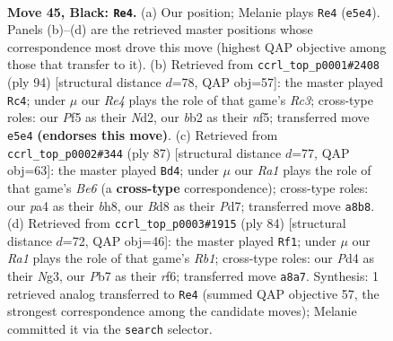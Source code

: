 \documentclass[11pt]{article}
\begin{document}
\clearpage

\begin{figure}[p]\centering
\begin{subfigure}{0.46\textwidth}\centering
\resizebox{\linewidth}{!}{%
\newchessgame
\chessboard[
  setfen={r2b4/1p5p/nk4pP/p3rp2/P2p1N2/3R2P1/1B6/R6K b - - 1 45},
  showmover=false,
  pgfstyle=straightmove, color=movearrow, markmove={e5-e4}
]}
\caption{}
\end{subfigure}\hfill
\begin{subfigure}{0.46\textwidth}\centering
\resizebox{\linewidth}{!}{%
\newchessgame
\chessboard[
  setfen={1r6/6pk/5p2/4pn1p/1r5P/1PR3P1/1R1N1PK1/8 w - - 37 48},
  showmover=false,
  pgfstyle=straightmove, color=movearrow, markmove={c3-c4}
]}
\caption{}
\end{subfigure}
\\[4pt]
\begin{subfigure}{0.46\textwidth}\centering
\resizebox{\linewidth}{!}{%
\newchessgame
\chessboard[
  setfen={7B/3p3p/2n1k1p1/8/pr2P3/Rp2b2P/1P4P1/R6K b - - 1 44},
  showmover=false,
  pgfstyle=straightmove, color=movearrow, markmove={e3-d4}
]}
\caption{}
\end{subfigure}\hfill
\begin{subfigure}{0.46\textwidth}\centering
\resizebox{\linewidth}{!}{%
\newchessgame
\chessboard[
  setfen={6k1/6r1/1p1p1r1p/p1n5/P1P5/1P2R1NP/6K1/1R6 w - - 2 43},
  showmover=false,
  pgfstyle=straightmove, color=movearrow, markmove={b1-f1}
]}
\caption{}
\end{subfigure}
\caption{\textbf{Move 45, Black: \texttt{Re4}.} (a) Our position; Melanie plays \texttt{Re4} (\texttt{e5e4}). Panels (b)--(d) are the retrieved master positions whose correspondence most drove this move (highest QAP objective among those that transfer to it). (b) Retrieved from \texttt{ccrl\_top\_p0001\#2408} (ply 94) [structural distance $d$=78, QAP obj=57]: the master played \texttt{Rc4}; under $\mu$ our \emph{Re4} plays the role of that game's \emph{Rc3}; cross-type roles: our \emph{P}f5 as their \emph{N}d2, our \emph{b}b2 as their \emph{n}f5; transferred move \texttt{e5e4} \textbf{(endorses this move)}. (c) Retrieved from \texttt{ccrl\_top\_p0002\#344} (ply 87) [structural distance $d$=77, QAP obj=63]: the master played \texttt{Bd4}; under $\mu$ our \emph{Ra1} plays the role of that game's \emph{Be6} (a \textbf{cross-type} correspondence); cross-type roles: our \emph{p}a4 as their \emph{b}h8, our \emph{B}d8 as their \emph{P}d7; transferred move \texttt{a8b8}. (d) Retrieved from \texttt{ccrl\_top\_p0003\#1915} (ply 84) [structural distance $d$=72, QAP obj=46]: the master played \texttt{Rf1}; under $\mu$ our \emph{Ra1} plays the role of that game's \emph{Rb1}; cross-type roles: our \emph{P}d4 as their \emph{N}g3, our \emph{P}b7 as their \emph{r}f6; transferred move \texttt{a8a7}. Synthesis: 1 retrieved analog transferred to \texttt{Re4} (summed QAP objective 57, the strongest correspondence among the candidate moves); Melanie committed it via the \texttt{search} selector.}
\label{fig:thought-m89}
\end{figure}
\end{document}
